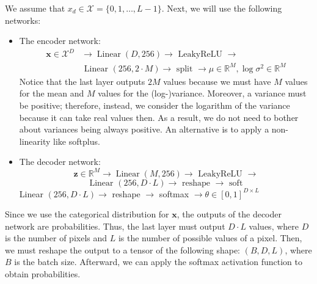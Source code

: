 \documentclass{article}
\begin{document}
\begin{appendix}
{We assume that $x_{d} \in \mathcal{X}=\{0,1, \ldots, L-1\}$.
Next, we will use the following networks:
\begin{itemize}
\item The encoder network:
$$
\begin{aligned}
\mathbf{x} \in \mathcal{X}^{D} & \rightarrow \operatorname{Linear}(D, 256) \rightarrow \text { LeakyReLU } \rightarrow \\
& \text { Linear }(256,2 \cdot M) \rightarrow \text { split } \rightarrow \mu \in \mathbb{R}^{M}, \log \sigma^{2} \in \mathbb{R}^{M}
\end{aligned}
$$
Notice that the last layer outputs $2 M$ values because we must have $M$ values for the mean and $M$ values for the (log-)variance. Moreover, a variance must be positive; therefore, instead, we consider the logarithm of the variance because it can take real values then. As a result, we do not need to bother about variances being always positive. An alternative is to apply a non-linearity like softplus.
\item The decoder network:
$$
\mathbf{z} \in \mathbb{R}^{M} \rightarrow \operatorname{Linear}(M, 256) \rightarrow \text { LeakyReLU } \rightarrow
$$
$$
\text { Linear }(256, D \cdot L) \rightarrow \text { reshape } \rightarrow \text { soft }
$$
Linear $(256, D \cdot L) \rightarrow$ reshape $\rightarrow$ softmax $\rightarrow \theta \in[0,1]^{D \times L}$
\end{itemize}

Since we use the categorical distribution for $\mathbf{x}$, the outputs of the decoder network are probabilities. Thus, the last layer must output $D \cdot L$ values, where $D$ is the number of pixels and $L$ is the number of possible values of a pixel. Then, we must reshape the output to a tensor of the following shape: $(B, D, L)$, where $B$ is the batch size. Afterward, we can apply the softmax activation function to obtain probabilities.

}
\end{appendix}
\end{document}
